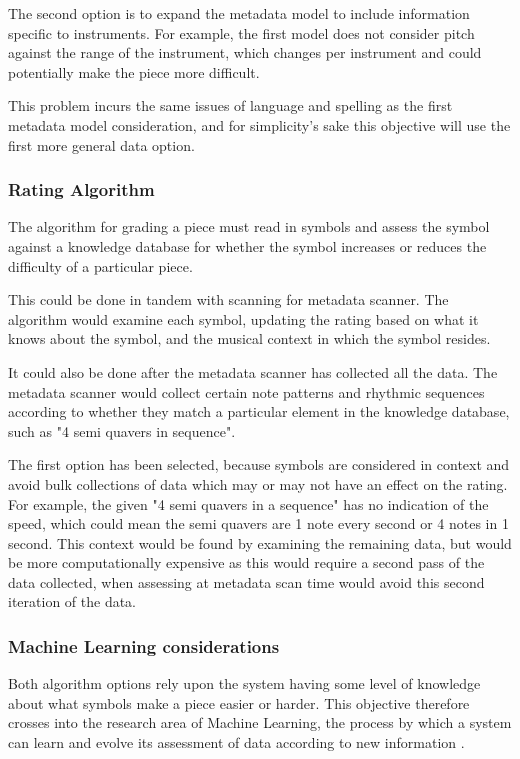 The second option is to expand the metadata model to include information specific to instruments. For example, the first model does not consider pitch against the range of the instrument, which changes per instrument and could potentially make the piece more difficult. 

This problem incurs the same issues of language and spelling as the first metadata model consideration, and for simplicity's sake this objective will use the first more general data option.

\subsubsection{Rating Algorithm}
The algorithm for grading a piece must read in symbols and assess the symbol against a knowledge database for whether the symbol increases or reduces the difficulty of a particular piece.

This could be done in tandem with scanning for metadata scanner. The algorithm would examine each symbol, updating the rating based on what it knows about the symbol, and the musical context in which the symbol resides.

It could also be done after the metadata scanner has collected all the data. The metadata scanner would collect certain note patterns and rhythmic sequences according to whether they match a particular element in the knowledge database, such as "4 semi quavers in sequence".

The first option has been selected, because symbols are considered in context and avoid bulk collections of data which may or may not have an effect on the rating. For example, the given "4 semi quavers in a sequence" has no indication of the speed, which could mean the semi quavers are 1 note every second or 4 notes in 1 second. This context would be found by examining the remaining data, but would be more computationally expensive as this would require a second pass of the data collected, when assessing at metadata scan time would avoid this second iteration of the data.

\subsubsection{Machine Learning considerations}
Both algorithm options rely upon the system having some level of knowledge about what symbols make a piece easier or harder. This objective therefore crosses into the research area of Machine Learning, the process by which a system can learn and evolve its assessment of data according to new information \parencite{ACM}.

